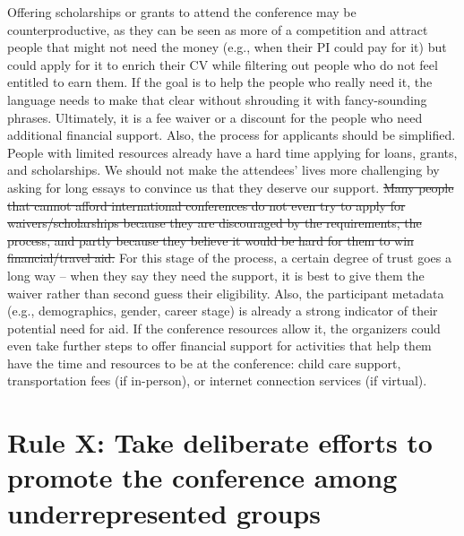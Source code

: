 \documentclass[10pt,letterpaper]{article}
\begin{document}
Offering scholarships or grants to attend the conference may be counterproductive, as they can be seen as more of a competition and attract people that might not need the money (e.g., when their PI could pay for it) but could apply for it to enrich their CV while filtering out people who do not feel entitled to earn them. If the goal is to help the people who really need it, the language needs to make that clear without shrouding it with fancy-sounding phrases. Ultimately, it is a fee waiver or a discount for the people who need additional financial support. Also, the process for applicants should be simplified. People with limited resources already have a hard time applying for loans, grants, and scholarships. We should not make the attendees' lives more challenging by asking for long essays to convince us that they deserve our support. \st{Many people that cannot afford international conferences do not even try to apply for waivers/scholarships because they are discouraged by the requirements, the process, and partly because they believe it would be hard for them to win financial/travel aid.} For this stage of the process, a certain degree of trust goes a long way -- when they say they need the support, it is best to give them the waiver rather than second guess their eligibility. Also, the participant metadata (e.g., demographics, gender, career stage) is already a strong indicator of their potential need for aid.
If the conference resources allow it, the organizers could even take further steps to offer financial support for activities that help them have the time and resources to be at the conference: child care support, transportation fees (if in-person), or internet connection services (if virtual). 


\section{Rule X: Take deliberate efforts to promote the conference among underrepresented groups}
\end{document}
